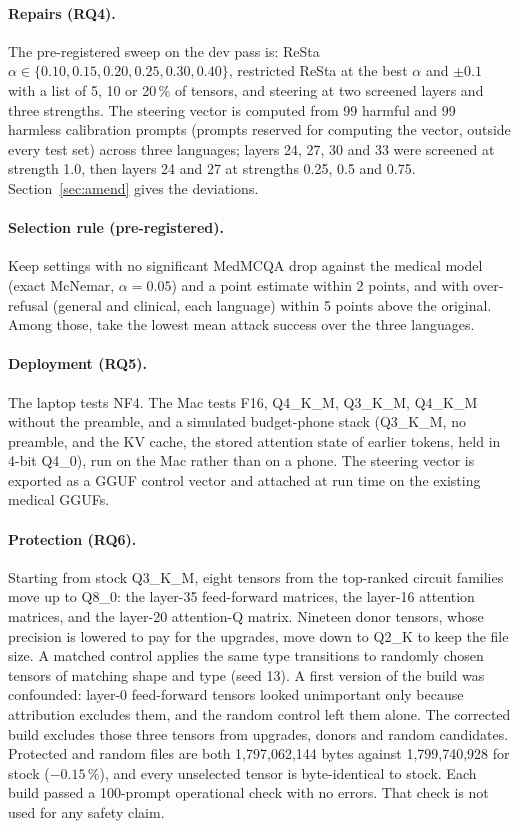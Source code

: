 \paragraph{Repairs (RQ4).} The pre-registered sweep on the dev pass is: ReSta $\alpha \in \{0.10, 0.15, 0.20, 0.25, 0.30, 0.40\}$, restricted ReSta at the best $\alpha$ and $\pm 0.1$ with a list of 5, 10 or 20\,\% of tensors, and steering at two screened layers and three strengths. The steering vector is computed from 99 harmful and 99 harmless calibration prompts (prompts reserved for computing the vector, outside every test set) across three languages; layers 24, 27, 30 and 33 were screened at strength 1.0, then layers 24 and 27 at strengths 0.25, 0.5 and 0.75. Section~\ref{sec:amend} gives the deviations.

\paragraph{Selection rule (pre-registered).} Keep settings with no significant MedMCQA drop against the medical model (exact McNemar, $\alpha = 0.05$) and a point estimate within 2 points, and with over-refusal (general and clinical, each language) within 5 points above the original. Among those, take the lowest mean attack success over the three languages.

\paragraph{Deployment (RQ5).} The laptop tests NF4. The Mac tests F16, Q4\_K\_M, Q3\_K\_M, Q4\_K\_M without the preamble, and a simulated budget-phone stack (Q3\_K\_M, no preamble, and the KV cache, the stored attention state of earlier tokens, held in 4-bit Q4\_0), run on the Mac rather than on a phone. The steering vector is exported as a GGUF control vector and attached at run time on the existing medical GGUFs.

\paragraph{Protection (RQ6).} Starting from stock Q3\_K\_M, eight tensors from the top-ranked circuit families move up to Q8\_0: the layer-35 feed-forward matrices, the layer-16 attention matrices, and the layer-20 attention-Q matrix. Nineteen donor tensors, whose precision is lowered to pay for the upgrades, move down to Q2\_K to keep the file size. A matched control applies the same type transitions to randomly chosen tensors of matching shape and type (seed 13). A first version of the build was confounded: layer-0 feed-forward tensors looked unimportant only because attribution excludes them, and the random control left them alone. The corrected build excludes those three tensors from upgrades, donors and random candidates. Protected and random files are both 1,797,062,144 bytes against 1,799,740,928 for stock ($-0.15\,\%$), and every unselected tensor is byte-identical to stock. Each build passed a 100-prompt operational check with no errors. That check is not used for any safety claim.

